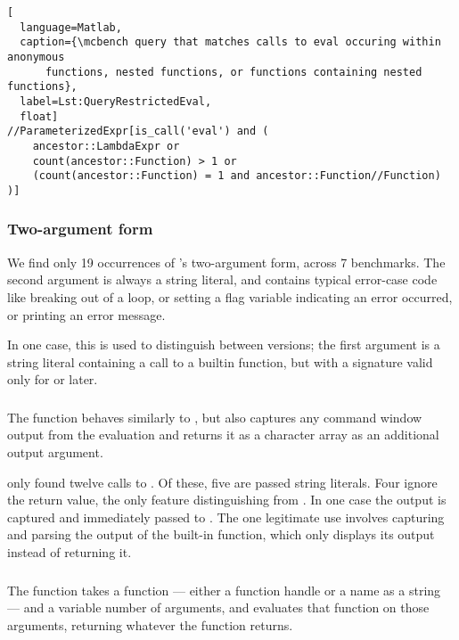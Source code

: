 \begin{lstlisting}[
  language=Matlab,
  caption={\mcbench query that matches calls to eval occuring within anonymous
      functions, nested functions, or functions containing nested functions},
  label=Lst:QueryRestrictedEval,
  float]
//ParameterizedExpr[is_call('eval') and (
    ancestor::LambdaExpr or
    count(ancestor::Function) > 1 or
    (count(ancestor::Function) = 1 and ancestor::Function//Function)
)]
\end{lstlisting}

\subsubsection{Two-argument form}

We find only 19 occurrences of 's two-argument form, across 7
benchmarks. The second argument is always a string literal, and contains
typical error-case code like breaking out of a loop, or setting a flag variable
indicating an error occurred, or printing an error message.

In one case, this is used to distinguish between \matlab versions; the first
argument is a string literal containing a call to a builtin function, but with
a signature valid only for  or later.

\subsubsection{}

The  function behaves similarly to , but also captures
any command window output from the evaluation and returns it as a character
array as an additional output argument.

\mcbench only found twelve calls to . Of these, five are passed
string literals. Four ignore the return value, the only feature distinguishing
 from . In one case the output is captured and
immediately passed to . The one legitimate use involves capturing
and parsing the output of the \matlab built-in  function, which
only displays its output instead of returning it.

\subsubsection{}

The  function takes a function --- either a function handle or a
name as a string --- and a variable number of arguments, and evaluates that
function on those arguments, returning whatever the function returns.

